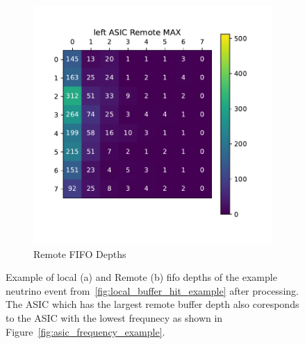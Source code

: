 \begin{figure}
\begin{subfigure}{.5\textwidth}
  \includegraphics[width=\textwidth]{images/left_asic_remote.pdf}
  \caption{Remote FIFO Depths}
\end{subfigure}
\caption{Example of local (a) and Remote (b) fifo depths of the example neutrino event from~\ref{fig:local_buffer_hit_example} after processing.
 The ASIC which has the largest remote buffer depth also coresponds to the ASIC with the lowest frequnecy as shown in Figure~\ref{fig:asic_frequency_example}.}
\label{fig:left_example_neutrino}
\end{figure}


